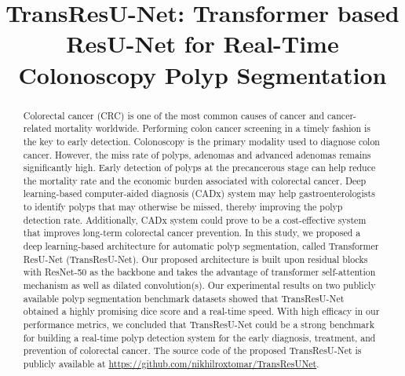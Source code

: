 \documentclass[conference]{IEEEtran}
\begin{document}
\title{TransResU-Net: Transformer based ResU-Net for Real-Time Colonoscopy Polyp Segmentation}
\author{

}

\maketitle
\thispagestyle{fancy}
\begin{abstract}
Colorectal cancer (CRC) is one of the most common causes of cancer and cancer-related mortality worldwide. Performing colon cancer screening in a timely fashion is the key to early detection. Colonoscopy is the primary modality used to diagnose colon cancer.  However, the miss rate of polyps, adenomas and advanced adenomas remains significantly high. Early detection of polyps at the precancerous stage can help reduce the mortality rate and the economic burden associated with colorectal cancer. Deep learning-based computer-aided diagnosis (CADx) system may help gastroenterologists to identify polyps that may otherwise be missed, thereby improving the polyp detection rate. Additionally, CADx system could prove to be a cost-effective system that improves long-term colorectal cancer prevention. In this study, we proposed a deep learning-based architecture for automatic polyp segmentation, called Transformer ResU-Net (TransResU-Net). Our proposed architecture is built upon residual blocks with ResNet-50 as the backbone and takes the advantage of transformer self-attention mechanism as well as dilated convolution(s). Our experimental results on two publicly available polyp segmentation benchmark datasets showed that TransResU-Net obtained a highly promising dice score and a real-time speed. With high efficacy in our performance metrics, we concluded that TransResU-Net could be a strong benchmark for building a real-time polyp detection system for the early diagnosis, treatment, and prevention of colorectal cancer. The source code of the proposed TransResU-Net is publicly available at \url{ https://github.com/nikhilroxtomar/TransResUNet}.
 
 


\end{abstract}
\end{document}

